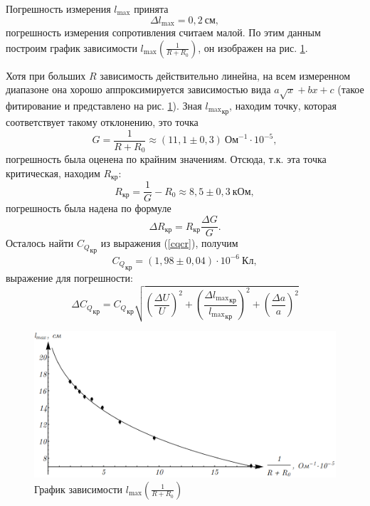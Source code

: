\documentclass[12pt,a4paper]{article}
\begin{document}
\noindent Погрешность измерения $l_\text{max}$ принята 
\begin{equation}
\Delta l_\text{max} = 0,2~\text{см},
\end{equation}
погрешность измерения сопротивления считаем малой.
По этим данным построим график зависимости $l_\text{max}\left(\frac{1}{R+R_0}\right)$, он изображен на рис. \ref{Fig6}.

Хотя при больших $R$ зависимость действительно линейна, на всем измеренном диапазоне она хорошо аппроксимируется зависимостью вида $a\sqrt{x} + bx + c$ (такое фитирование и представлено на рис. \ref{Fig6}). Зная ${l_\text{max}}_\text{кр}$, находим точку, которая соответствует такому отклонению, это точка
\begin{equation}
G = \frac{1}{R + R_0} \approx (11,1\pm0,3)~\text{Ом}^{-1}\cdot10^{-5},
\end{equation}
погрешность была оценена по крайним значениям. Отсюда, т.к. эта точка критическая, находим $R_\text{кр}$:
\begin{equation}
R_\text{кр} = \frac{1}{G} - R_0 \approx 8,5 \pm 0,3~\text{кОм},
\end{equation}
погрешность была надена по формуле
\begin{equation}
\Delta R_\text{кр} = R_\text{кр}\frac{\Delta G}{G}.
\end{equation}
Осталось найти ${C_Q}_\text{кр}$ из выражения (\ref{cqcr}), получим
\begin{equation}
{C_Q}_\text{кр} = (1,98 \pm 0,04) \cdot 10^{-6}~\text{Кл},
\end{equation}
выражение для погрешности: 
\begin{equation}
\Delta {C_Q}_\text{кр} = {C_Q}_\text{кр}\sqrt{\left(\frac{\Delta U}{U}\right)^2 + \left(\frac{\Delta {l_\text{max}}_\text{кр}}{{l_\text{max}}_\text{кр}}\right)^2 + \left(\frac{\Delta a}{a}\right)^2}
\end{equation}

\begin{figure}[ht]\centering
\includegraphics[width = 1\textwidth]{Plot3}
\captionsetup{justification = centering}
\caption{График зависимости $l_\text{max}\left(\frac{1}{R+R_0}\right)$\label{Fig6}} 
\end{figure}
\end{document}
